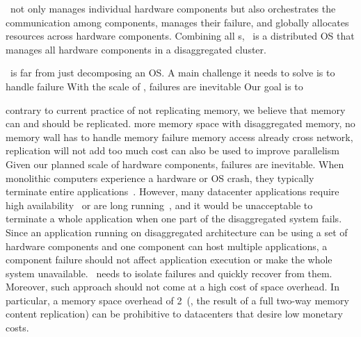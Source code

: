 \documentclass[10pt,times,twocolumn]{z2-article}
\begin{document}
\splitkernel\ not only manages individual hardware components but also orchestrates the communication
among components, manages their failure, and globally allocates resources across hardware components.
Combining all \microos{}s, \splitkernel\ is a distributed OS that manages all hardware components in a disaggregated cluster.
\fi







\splitkernel\ is far from just decomposing an OS. 
A main challenge it needs to solve is to handle failure 
With the scale of \dcrack, failures are inevitable
Our goal is to 

contrary to current practice of not replicating memory, we believe that memory can and should be replicated. 
more memory space with disaggregated memory, no memory wall
has to handle memory failure
memory access already cross network, replication will not add too much cost
can also be used to improve parallelism
Given our planned scale of hardware components, failures are inevitable.
When monolithic computers experience a hardware or OS crash, they typically terminate entire applications~\cite{Depoutovitch10-otherworld}.
However, many datacenter applications require high availability~\cite{MongoDB} or are long running~\cite{TensorFlow},
and it would be unacceptable to terminate a whole application when one part of the disaggregated system fails.
Since an application running on disaggregated architecture
can be using a set of hardware components and one component can host multiple applications, 
a component failure should not affect application execution or make the whole system unavailable.
\splitkernel\ needs to isolate failures and quickly recover from them. %
Moreover, such approach should not come at a high cost of space overhead.
In particular, a memory space overhead of 2\x\ (\eg, the result of a full two-way memory content replication) 
can be prohibitive to datacenters that desire low monetary costs.
\fi
\end{document}
